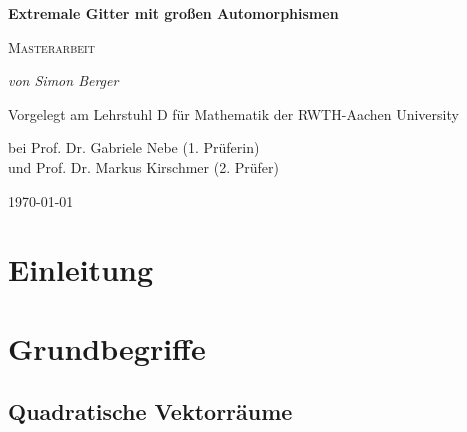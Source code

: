 \documentclass[12pt,a4paper,halfparskip,headsepline,bibtotocnumbered]{scrreprt}
\theoremstyle{nummermitklammern}
\theoremstyle{nonumberbreak}
\begin{document}

\begin{titlepage}
	\centering
	\vspace*{2cm}
	{\Large\bfseries Extremale Gitter mit großen Automorphismen\par}
	\vspace{1cm}
	{\scshape\Large Masterarbeit\par}
	\vspace{2cm}
	{\Large\itshape von Simon Berger\par}
	\vfill
	Vorgelegt am Lehrstuhl D für Mathematik der RWTH-Aachen University\par 
	bei Prof. Dr. Gabriele Nebe (1. Prüferin)\\ 
	und Prof. Dr. Markus Kirschmer (2. Prüfer)\par
	\vfill

	{\large \today\par}
\end{titlepage}


\tableofcontents

\chapter{Einleitung}



\chapter{Grundbegriffe}

\section{Quadratische Vektorräume}
\end{document}
